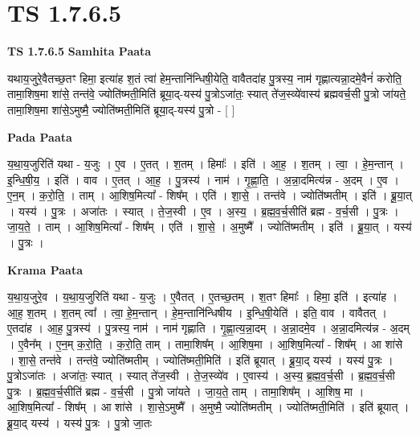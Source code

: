 \documentclass[17pt]{extarticle}
\begin{document}
\section{ TS 1.7.6.5 }

\textbf{TS 1.7.6.5 } \newline
\textbf{Samhita Paata} \newline

यथाय॒जुरे॒वैतच्छ॒तꣳ हिमा॒ इत्या॑ह श॒तं त्वा॑ हेम॒न्तानि॑न्धिषी॒येति॒ वावैतदा॑ह पु॒त्रस्य॒ नाम॑ गृह्णात्यन्ना॒दमे॒वैनं॑ करोति॒ तामा॒शिष॒मा शा॑से॒ तन्त॑वे॒ ज्योति॑ष्मती॒मिति॑ ब्रूया॒द्-यस्य॑ पु॒त्रोऽजा॑तः॒ स्यात् ते॑ज॒स्व्ये॑वास्य॑ ब्रह्मवर्च॒सी पु॒त्रो जा॑यते॒ तामा॒शिष॒मा शा॑से॒ऽमुष्मै॒ ज्योति॑ष्मती॒मिति॑ ब्रूया॒द्-यस्य॑ पु॒त्रो - [ ] \newline

\textbf{Pada Paata} \newline

य॒था॒य॒जुरिति॑ यथा - य॒जुः । ए॒व । ए॒तत् । श॒तम् । हिमाः᳚ । इति॑ । आ॒ह॒ । श॒तम् । त्वा॒ । हे॒म॒न्तान् । इ॒न्धि॒षी॒य॒ । इति॑ । वाव । ए॒तत् । आ॒ह॒ । पु॒त्रस्य॑ । नाम॑ । गृ॒ह्णा॒ति॒ । अ॒न्ना॒दमित्य॑न्न - अ॒दम् । ए॒व । ए॒न॒म् । क॒रो॒ति॒ । ताम् । आ॒शिष॒मित्या᳚ - शिष᳚म् । एति॑ । शा॒से॒ । तन्त॑वे । ज्योति॑ष्मतीम् । इति॑ । ब्रू॒या॒त् । यस्य॑ । पु॒त्रः । अजा॑तः । स्यात् । ते॒ज॒स्वी । ए॒व । अ॒स्य॒ । ब्र॒ह्म॒व॒र्च॒सीति॑ ब्रह्म - व॒र्च॒सी । पु॒त्रः । जा॒य॒ते॒ । ताम् । आ॒शिष॒मित्या᳚ - शिष᳚म् । एति॑ । शा॒से॒ । अ॒मुष्मै᳚ । ज्योति॑ष्मतीम् । इति॑ । ब्रू॒या॒त् । यस्य॑ । पु॒त्रः ।  \newline


\textbf{Krama Paata} \newline

य॒था॒य॒जुरे॒व । य॒था॒य॒जुरिति॑ यथा - य॒जुः । ए॒वैतत् । ए॒तच्छ॒तम् । श॒तꣳ हिमाः᳚ । हिमा॒ इति॑ । इत्या॑ह । आ॒ह॒ श॒तम् । श॒तम् त्वा᳚ । त्वा॒ हे॒म॒न्तान् । हे॒म॒न्तानि॑न्धिषीय । इ॒न्धि॒षी॒येति॑ । इति॒ वाव । वावैतत् । ए॒तदा॑ह । आ॒ह॒ पु॒त्रस्य॑ । पु॒त्रस्य॒ नाम॑ । नाम॑ गृह्णाति । गृ॒ह्णा॒त्य॒न्ना॒दम् । अ॒न्ना॒दमे॒व । अ॒न्ना॒दमित्य॑न्न - अ॒दम् । ए॒वैन᳚म् । ए॒न॒म् क॒रो॒ति॒ । क॒रो॒ति॒ ताम् । तामा॒शिष᳚म् । आ॒शिष॒मा । आ॒शिष॒मित्या᳚ - शिष᳚म् । आ शा॑से । शा॒से॒ तन्त॑वे । तन्त॑वे॒ ज्योति॑ष्मतीम् । ज्योति॑ष्मती॒मिति॑ । इति॑ ब्रूयात् । ब्रू॒या॒द् यस्य॑ । यस्य॑ पु॒त्रः । पु॒त्रोऽजा॑तः । अजा॑तः॒ स्यात् । स्यात् ते॑ज॒स्वी । ते॒ज॒स्व्ये॑व । ए॒वास्य॑ । अ॒स्य॒ ब्र॒ह्म॒व॒र्च॒सी । ब्र॒ह्म॒व॒र्च॒सी पु॒त्रः । ब्र॒ह्म॒व॒र्च॒सीति॑ ब्रह्म - व॒र्च॒सी । पु॒त्रो जा॑यते । जा॒य॒ते॒ ताम् । तामा॒शिष᳚म् । आ॒शिष॒ मा । आ॒शिष॒मित्या᳚ - शिष᳚म् । आ शा॑से । शा॒से॒ऽमुष्मै᳚ । अ॒मुष्मै॒ ज्योति॑ष्मतीम् । ज्योति॑ष्मती॒मिति॑ । इति॑ ब्रूयात् । ब्रू॒या॒द् यस्य॑ । यस्य॑ पु॒त्रः । पु॒त्रो जा॒तः \newline
\end{document}
